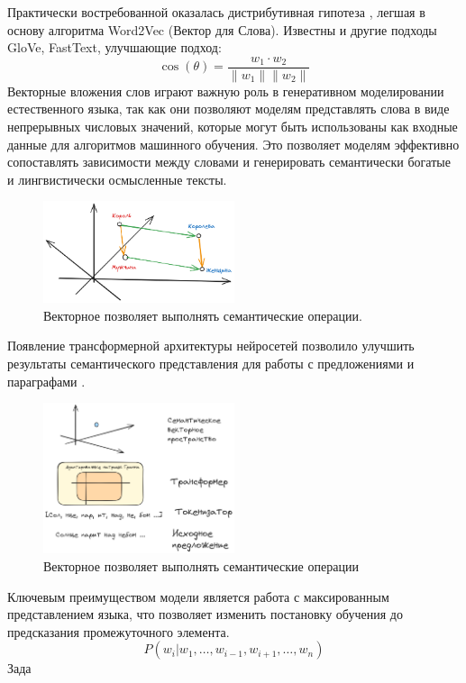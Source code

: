 Практически востребованной оказалась дистрибутивная гипотеза \cite{Schutze}, легшая в основу алгоритма Word2Vec (Вектор для Слова)\cite{NIPS2013_9aa42b31}. 
Известны и другие подходы GloVe, FastText, улучшающие подход:
\begin{equation}
    \cos(\theta) = \frac{w_1 \cdot w_2}{\|w_1\| \|w_2\|}
\end{equation}
Векторные вложения слов играют важную роль в генеративном моделировании естественного языка, так как они позволяют моделям представлять слова в виде непрерывных 
числовых значений, которые могут быть использованы как входные данные для алгоритмов машинного обучения. Это позволяет моделям эффективно сопоставлять зависимости 
между словами и генерировать семантически богатые и лингвистически осмысленные тексты.
\begin{figure}[h]
    \centering
    \includegraphics[width=0.5\textwidth]{assets/ml/nlp/vector.excalidraw.png}
    \caption{Векторное позволяет выполнять семантические операции.}
    \label{embedding}
\end{figure}
Появление трансформерной архитектуры нейросетей  позволило улучшить результаты семантического представления для
работы с предложениями и параграфами \cite{devlin2018bert}.
\begin{figure}[h]
    \centering
    \includegraphics[width=0.5\textwidth]{assets/ml/nlp/bert.excalidraw.png}
    \caption{Векторное позволяет выполнять семантические операции}
    \label{nert}
\end{figure}
Ключевым преимуществом модели является работа с максированным представлением языка, что позволяет изменить постановку обучения 
до предсказания промежуточного элемента.
\begin{equation}
    P(w_i |w_1,\dots,w_{i-1},w_{i+1},\dots, w_n) 
\end{equation}
Зада




